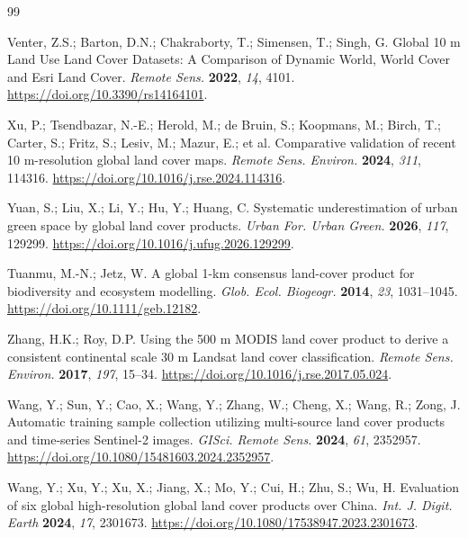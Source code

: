 \documentclass[remotesensing,article,submit,moreauthors]{Definitions/mdpi}
\begin{document}
\begin{thebibliography}{99}

Venter, Z.S.; Barton, D.N.; Chakraborty, T.; Simensen, T.; Singh, G.
Global 10 m Land Use Land Cover Datasets: A Comparison of Dynamic World, World
Cover and Esri Land Cover. \textit{Remote Sens.} \textbf{2022}, \textit{14}, 4101.
\href{https://doi.org/10.3390/rs14164101}{https://doi.org/10.3390/rs14164101}.

Xu, P.; Tsendbazar, N.-E.; Herold, M.; de Bruin, S.; Koopmans, M.; Birch, T.;
Carter, S.; Fritz, S.; Lesiv, M.; Mazur, E.; et al.
Comparative validation of recent 10 m-resolution global land cover maps.
\textit{Remote Sens. Environ.} \textbf{2024}, \textit{311}, 114316.
\href{https://doi.org/10.1016/j.rse.2024.114316}{https://doi.org/10.1016/j.rse.2024.114316}.

Yuan, S.; Liu, X.; Li, Y.; Hu, Y.; Huang, C.
Systematic underestimation of urban green space by global land cover products.
\textit{Urban For. Urban Green.} \textbf{2026}, \textit{117}, 129299.
\href{https://doi.org/10.1016/j.ufug.2026.129299}{https://doi.org/10.1016/j.ufug.2026.129299}.

Tuanmu, M.-N.; Jetz, W.
A global 1-km consensus land-cover product for biodiversity and ecosystem
modelling. \textit{Glob. Ecol. Biogeogr.} \textbf{2014}, \textit{23}, 1031--1045.
\href{https://doi.org/10.1111/geb.12182}{https://doi.org/10.1111/geb.12182}.

Zhang, H.K.; Roy, D.P.
Using the 500 m MODIS land cover product to derive a consistent continental
scale 30 m Landsat land cover classification. \textit{Remote Sens. Environ.}
\textbf{2017}, \textit{197}, 15--34.
\href{https://doi.org/10.1016/j.rse.2017.05.024}{https://doi.org/10.1016/j.rse.2017.05.024}.

Wang, Y.; Sun, Y.; Cao, X.; Wang, Y.; Zhang, W.; Cheng, X.; Wang, R.; Zong, J.
Automatic training sample collection utilizing multi-source land cover products
and time-series Sentinel-2 images. \textit{GISci. Remote Sens.}
\textbf{2024}, \textit{61}, 2352957.
\href{https://doi.org/10.1080/15481603.2024.2352957}{https://doi.org/10.1080/15481603.2024.2352957}.

Wang, Y.; Xu, Y.; Xu, X.; Jiang, X.; Mo, Y.; Cui, H.; Zhu, S.; Wu, H.
Evaluation of six global high-resolution global land cover products over China.
\textit{Int. J. Digit. Earth} \textbf{2024}, \textit{17}, 2301673.
\href{https://doi.org/10.1080/17538947.2023.2301673}{https://doi.org/10.1080/17538947.2023.2301673}.


\end{thebibliography}
\end{document}

